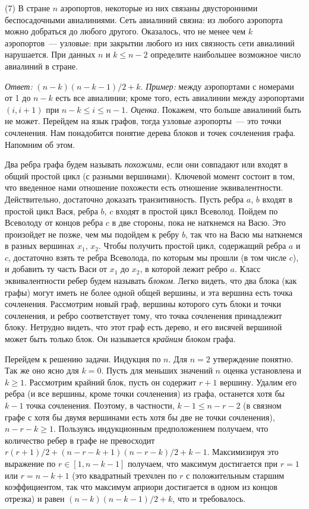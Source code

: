 \textsf{(7)}
В стране $n$ аэропортов, некоторые из них связаны двусторонними беспосадочными
авиалиниями.
Сеть авиалиний связна:
из любого аэропорта можно добраться до любого другого.
Оказалось, что не менее чем $k$ аэропортов~--- узловые:
при закрытии любого из них связность сети авиалиний нарушается.
При данных $n$ и $k \leq n - 2$ определите наибольшее возможное число авиалиний
в стране.

\solution
\emph{Ответ:} $(n - k) (n - k - 1) / 2 + k$.
\emph{Пример:}
между аэропортами с номерами от 1 до $n - k$ есть все авиалинии; кроме того,
есть авиалинии между аэропортами $(i, i + 1)$ при
$n - k \leq i \leq n - 1$.
\emph{Оценка.}
Покажем, что больше авиалиний быть не может.
Перейдем на язык графов, тогда узловые аэропорты~--- это точки сочленения.
Нам понадобится понятие дерева блоков и точек сочленения графа.
Напомним об этом.
\par
Два ребра графа будем называть \emph{похожими}, если они совпадают или входят в
общий простой цикл (с разными вершинами).
Ключевой момент состоит в том, что введенное нами отношение похожести есть отношение эквивалентности.
Действительно, достаточно доказать транзитивность.
Пусть ребра $a$, $b$ входят в простой цикл Вася, ребра $b$, $c$ входят в
простой цикл Всеволод.
Пойдем по Всеволоду от концов ребра $c$ в две стороны, пока не наткнемся на
Васю.
Это произойдет не позже, чем мы подойдем к ребру $b$, так что на Васю мы
наткнемся в разных вершинах $x_1$, $x_2$.
Чтобы получить простой цикл, содержащий ребра $a$ и $c$, достаточно взять те
ребра Всеволода, по которым мы прошли (в том числе $c$), и добавить ту часть
Васи от $x_1$  до $x_2$, в которой лежит ребро $a$.
Класс эквивалентности ребер будем называть \emph{блоком}.
Легко видеть, что два блока (как графы) могут иметь не более одной общей
вершины, и эта вершина есть точка сочленения.
Рассмотрим новый граф, вершины которого суть блоки и точки сочленения,
и ребро соответствует тому, что точка сочленения принадлежит блоку.
Нетрудно видеть, что этот граф есть дерево, и его висячей вершиной может быть
только блок.
Он называется \emph{крайним блоком} графа. 
\par
Перейдем к решению задачи.
Индукция по $n$.
Для $n = 2$ утверждение понятно.
Так же оно ясно для $k = 0$.
Пусть для меньших значений $n$ оценка установлена и $k \geq 1$.
Рассмотрим крайний блок, пусть он содержит $r + 1$ вершину.
Удалим его ребра (и все вершины, кроме точки сочленения) из графа,
останется хотя бы $k - 1$ точка сочленения.
Поэтому, в частности, $k - 1 \leq n - r - 2$
(в связном графе с хотя бы двумя вершинами есть хотя бы две не точки
сочленения),
$n - r - k \geq 1$.
Пользуясь индукционным предположением получаем, что количество ребер в графе
не превосходит
$r (r + 1) / 2 + (n - r - k + 1) (n - r - k) / 2 + k - 1$.
Максимизируя это выражение по $r \in [1, n - k - 1]$ получаем,
что максимум достигается при $r = 1$ или $r = n - k + 1$
(это квадратный трехчлен по $r$ с положительным старшим коэффициентом,
так что максимум априори достигается в одном из концов отрезка)
и равен $(n - k) (n - k - 1) / 2 + k$, что и требовалось.

